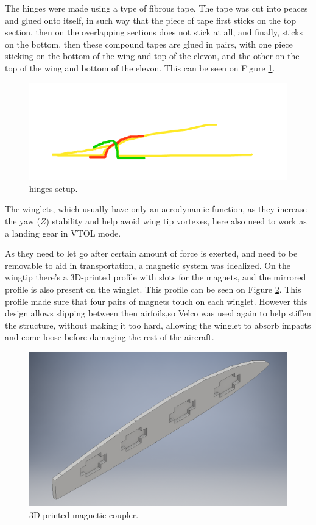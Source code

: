 The hinges were made using a type of fibrous tape. The tape was cut into peaces and glued onto itself, in such way that the piece of tape first sticks on the top section, then on the overlapping sections does not stick at all, and finally, sticks on the bottom.
then these compound tapes are glued in pairs, with one piece sticking on the bottom of the wing and top of the elevon, and the other on the top of the wing and bottom of the elevon. This can be seen on Figure \ref{fig:hinges}.


\begin{figure}[H]
\centering
  \includegraphics[width=\linewidth]{figs/hinges.png}
  \caption{hinges setup.}
  \label{fig:hinges}
\end{figure}
	
	
	
The winglets, which usually have only an aerodynamic function, as they increase the yaw ($Z$) stability and help avoid wing tip vortexes, here also need to work as a landing gear in VTOL mode.

As they need to let go after certain amount of force is exerted, and need to be removable to aid in transportation, a magnetic system was idealized. On the wingtip there's a 3D-printed profile with slots for the magnets, and the mirrored profile is also present on the winglet. This profile can be seen on Figure \ref{fig:magnetcoupler}. This profile made sure that four pairs of magnets touch on each winglet. However this design allows slipping between then airfoils,so Velco was used again to help stiffen the structure, without making it too hard, allowing the winglet to absorb impacts and come loose before damaging the rest of the aircraft.

	
\begin{figure}[H]
\centering
  \includegraphics[width=\linewidth]{figs/magnetcoupler.png}
  \caption{3D-printed magnetic coupler.}
  \label{fig:magnetcoupler}
\end{figure}
	


